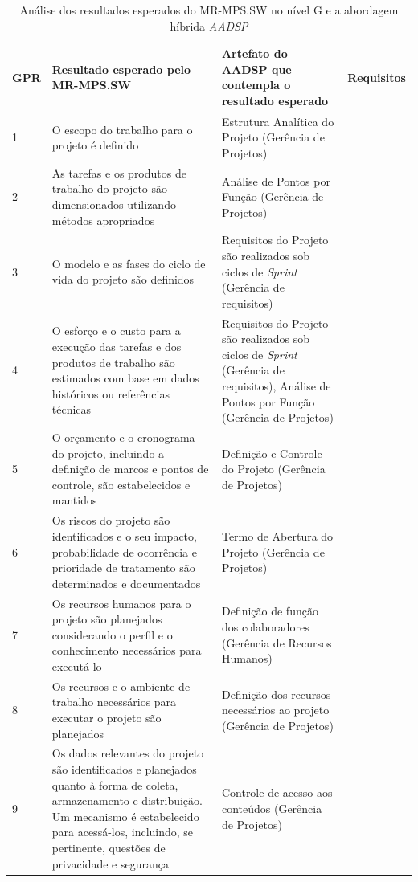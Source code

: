 \documentclass{acm_proc_article-sp}
\begin{document}
\begin{table}[h]
\scriptsize
\caption{Análise dos resultados esperados do MR-MPS.SW no nível G e a abordagem híbrida \textit{AADSP} \cite{aadsp:hibirdo}} 
\centering
\begin{tabular}{|p{10mm}|p{60mm}|p{60mm}|p{25mm}|}
\hline
GPR & Resultado esperado pelo MR-MPS.SW & Artefato do AADSP que contempla o resultado esperado & Requisitos \\
\hline
1 & O escopo do trabalho para o projeto é definido & Estrutura Analítica do Projeto
(Gerência de Projetos) & \\
2 & As tarefas e os produtos de trabalho do projeto são dimensionados utilizando métodos apropriados & Análise de Pontos por Função (Gerência de Projetos) & \\
3 & O modelo e as fases do ciclo de vida do projeto são definidos & Requisitos do Projeto são realizados sob ciclos de \textit{Sprint} (Gerência de requisitos) &\\
4 &  O esforço e o custo para a execução das tarefas e dos produtos de trabalho são estimados com base em dados históricos ou referências técnicas & Requisitos do Projeto são realizados sob ciclos de \textit{Sprint} (Gerência de requisitos), Análise de Pontos por Função (Gerência de Projetos) & \\
5 & O orçamento e o cronograma do projeto, incluindo a definição de marcos e pontos de controle, são estabelecidos e mantidos
& Definição e Controle do Projeto (Gerência de Projetos) & \\
6 & Os riscos do projeto são identificados e o seu impacto, probabilidade de ocorrência e prioridade de tratamento são
determinados e documentados & Termo de Abertura do Projeto (Gerência de Projetos) & \\
7 & Os recursos humanos para o projeto são planejados considerando o perfil e o conhecimento necessários para executá-lo & Definição de função dos colaboradores (Gerência de Recursos Humanos) & \\
8 & Os recursos e o ambiente de trabalho necessários para executar o projeto são planejados & Definição dos recursos necessários ao projeto (Gerência de Projetos) & \\
9 & Os dados relevantes do projeto são identificados e planejados quanto à forma de coleta, armazenamento e distribuição. Um mecanismo é estabelecido para acessá-los, incluindo, se pertinente, questões de privacidade e segurança & Controle de acesso aos conteúdos (Gerência de Projetos) & \\

\end{tabular}
\end{table}
\end{document}
